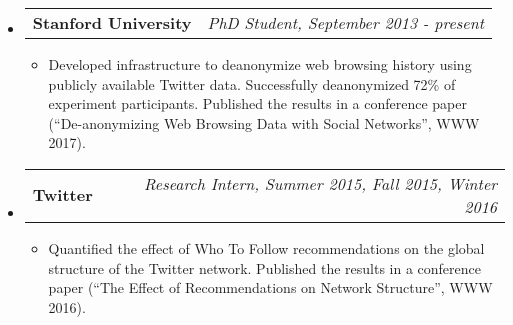 \documentclass[letterpaper,10pt]{article}
\makeatletter
\newcommand{\ressubheading}[4]{
\begin{tabular*}{7.0in}{l@{\extracolsep{\fill}}r}
		\textbf{#1} & \textit{#4} \\
\end{tabular*}\vspace{-6pt}}
\makeatother
\begin{document}
\begin{itemize}
\item
	\ressubheading{Stanford University}{Stanford, CA}{PhD Student}{PhD Student, September 2013 - present}
	\begin{itemize}
	\item Developed infrastructure to deanonymize web browsing history using publicly available Twitter data.  Successfully deanonymized 72\% of experiment participants.  Published the results in a conference paper (``De-anonymizing Web Browsing Data with Social Networks'', WWW 2017).
	\end{itemize}
\item
	\ressubheading{Twitter}{San Francisco, CA}{Research Intern}{Research Intern, Summer 2015, Fall 2015, Winter 2016}
	\begin{itemize}
\item Quantified the effect of Who To Follow recommendations on the global structure of the Twitter network.  Published the results in a conference paper (``The Effect of Recommendations on Network Structure'', WWW 2016).


\end{itemize}
\end{itemize}
\end{document}

